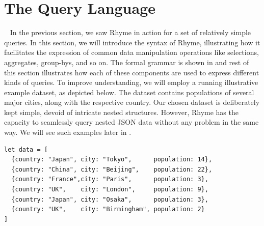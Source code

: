 \documentclass[runningheads]{llncs}
\newcommand{\lang}{Rhyme}
\begin{document}
\section{The Query Language}~\label{sec:query_language}
In the previous section, we saw \lang{} in action for a set of relatively simple queries.
In this section, we will introduce the syntax of \lang{}, illustrating
how it facilitates the expression of common data manipulation operations like
selections, aggregates, group-bys, and so on.
The formal grammar is shown in  and
rest of this section illustrates how each of these components are used to express
different kinds of queries.
To improve understanding, we will employ a running illustrative example dataset, as
depicted below.
The dataset contains populations of several major cities,
along with the respective country.
Our chosen dataset is deliberately kept simple, devoid of
intricate nested structures.
However, \lang{} has the capacity to seamlessly query
nested JSON data without any problem in the same way.
We will see such examples later in .

\begin{lstlisting}[style=JavaScript]
let data = [
  {country: "Japan", city: "Tokyo",      population: 14},
  {country: "China", city: "Beijing",    population: 22},
  {country: "France",city: "Paris",      population: 3},
  {country: "UK",    city: "London",     population: 9},
  {country: "Japan", city: "Osaka",      population: 3},
  {country: "UK",    city: "Birmingham", population: 2}
]
\end{lstlisting}
\end{document}
